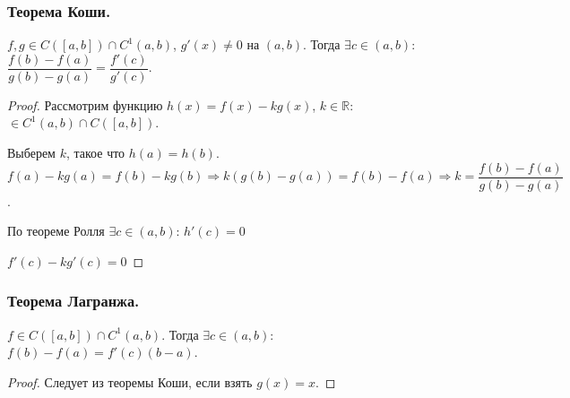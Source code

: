 \documentclass[12pt]{article}
\begin{document}
	\subsubsection{Теорема Коши.}
	\begin{theorem}[Коши]
		$f, g \in C([a, b]) \cap C^1(a, b)$, $g'(x) \ne 0$ на $(a, b)$. Тогда $\exists c \in (a, b)$: $\dfrac{f(b) - f(a)}{g(b) - g(a)} = \dfrac{f'(c)}{g'(c)}$.
	\end{theorem}
	\begin{proof}
		Рассмотрим функцию $h(x) = f(x) - k g(x)$, $k \in \mathbb{R}$: $\in C^1(a, b) \cap C([a, b])$.
		
		Выберем $k$, такое что $h(a) = h(b)$. $f(a) - k g(a) = f(b) - k g(b) \Rightarrow k(g(b) - g(a)) = f(b) - f(a) \Rightarrow k = \dfrac{f(b) - f(a)}{g(b) - g(a)}$.
		
		По теореме Ролля $\exists c \in (a, b)$: $h'(c) = 0$
		
		$f'(c) - k g'(c) = 0$
	\end{proof}
	\subsubsection{Теорема Лагранжа.}
	\begin{theorem}
		$f \in C([a, b]) \cap C^1(a, b)$. Тогда $\exists c \in (a, b)$: $f(b) - f(a) = f'(c)(b - a)$.
	\end{theorem}
	\begin{proof}
		Следует из теоремы Коши, если взять $g(x) = x$.
	\end{proof}
\end{document}
